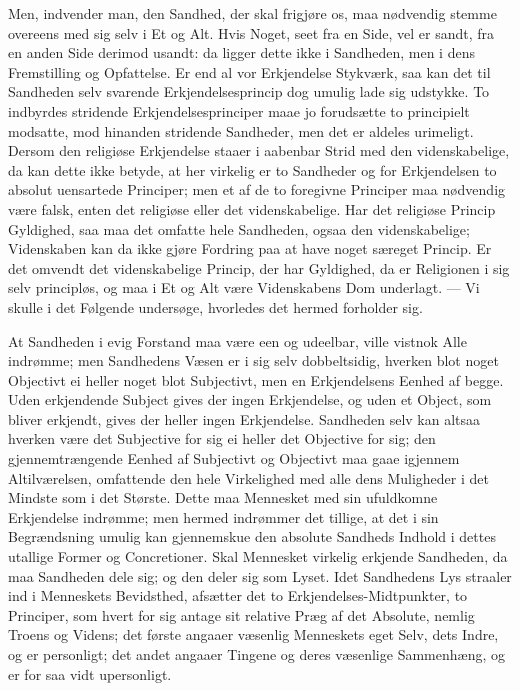 \documentclass[12pt,a4paper]{article}
\begin{document}
Men, indvender man, den Sandhed, der skal frigjøre os, maa nødvendig
stemme overeens med sig selv i Et og Alt. Hvis Noget, seet fra en
Side, vel er sandt, fra en anden Side derimod usandt: da ligger dette
ikke i Sandheden, men i dens Fremstilling og Opfattelse. Er end al vor
Erkjendelse Stykværk, saa kan det til Sandheden selv svarende
Erkjendelsesprincip dog umulig lade sig udstykke. To indbyrdes
stridende Erkjendelsesprinciper maae jo forudsætte to principielt
modsatte, mod hinanden stridende Sandheder, men det er aldeles
urimeligt. Dersom den religiøse Erkjendelse staaer i aabenbar Strid
med den videnskabelige, da kan dette ikke betyde, at her virkelig er
to Sandheder og for Erkjendelsen to absolut uensartede Principer; men
et af de to foregivne Principer maa nødvendig være falsk, enten det
religiøse eller det videnskabelige. Har det religiøse Princip Gyldighed,
saa maa det omfatte hele Sandheden, ogsaa den videnskabelige; Videnskaben
kan da ikke gjøre Fordring paa at have noget særeget Princip. Er det
omvendt det videnskabelige Princip, der har Gyldighed, da er Religionen
i sig selv principløs, og maa i Et og Alt være Videnskabens Dom
underlagt. --- Vi skulle i det Følgende undersøge, hvorledes det hermed
forholder sig.

At Sandheden i evig Forstand maa være een og udeelbar, ville vistnok
Alle indrømme; men Sandhedens Væsen er i sig selv dobbeltsidig,
hverken blot noget Objectivt ei heller noget blot Subjectivt, men en
Erkjendelsens Eenhed af begge. Uden erkjendende Subject gives der ingen
Erkjendelse, og uden et Object, som bliver erkjendt, gives der heller
ingen Erkjendelse. Sandheden selv kan altsaa hverken være det
Subjective for sig ei heller det Objective for sig; den gjennemtrængende
Eenhed af Subjectivt og Objectivt maa gaae igjennem Altilværelsen,
omfattende den hele Virkelighed med alle dens Muligheder i det Mindste
som i det Største. Dette maa Mennesket med sin ufuldkomne Erkjendelse
indrømme; men hermed indrømmer det tillige, at det i sin Begrændsning
umulig kan gjennemskue den absolute Sandheds Indhold i dettes utallige
Former og Concretioner. Skal Mennesket virkelig erkjende Sandheden, da
maa Sandheden dele sig; og den deler sig som Lyset. Idet Sandhedens
Lys straaler ind i Menneskets Bevidsthed, afsætter det to
Erkjendelses-Midtpunkter, to Principer, som hvert for sig antage sit
relative Præg af det Absolute, nemlig Troens og Videns; det første
angaaer væsenlig Menneskets eget Selv, dets Indre, og er personligt;
det andet angaaer Tingene og deres væsenlige Sammenhæng, og er for saa
vidt upersonligt.
\end{document}
